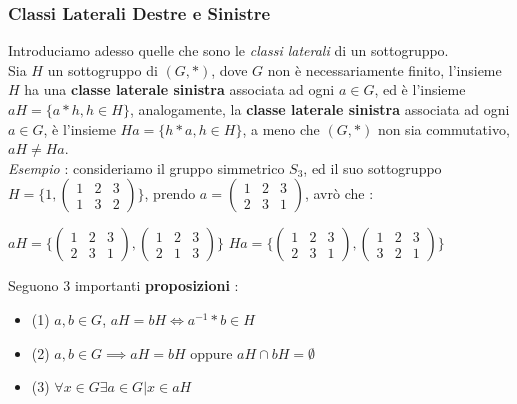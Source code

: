 \documentclass[12pt, letterpaper]{article}
\begin{document}
\subsubsection{Classi Laterali Destre e Sinistre}
 Introduciamo adesso quelle che sono le \textit{classi laterali} di un sottogruppo.\\
 Sia \(H\) un sottogruppo di \((G,*)\), dove \(G\) non è necessariamente finito, l'insieme 
 \(H\) ha una \textbf{classe laterale sinistra} associata ad ogni \(a\in G\), ed è l'insieme \(aH=\{a*h, h\in H\}\), 
 analogamente, la \textbf{classe laterale sinistra} associata ad ogni \(a\in G\),  è l'insieme \(Ha=\{h*a, h\in H\}\), 
 a meno che \((G,*)\) non sia commutativo, \(aH\ne Ha\). \\
 \textit{Esempio }: consideriamo il gruppo simmetrico \(S_3\), ed il suo sottogruppo \(H=\Bigg\{1,
 \begin{pmatrix}
    1 & 2 & 3\\
    1 & 3 & 2
    \end{pmatrix}
    \Bigg\}\), prendo \(a= \begin{pmatrix}
        1 & 2 & 3\\
        2 & 3 & 1
        \end{pmatrix}\), avrò che : \begin{center}
            \(
            aH=  \Bigg\{\begin{pmatrix}
                1 & 2 & 3\\
                2 & 3 & 1
                \end{pmatrix},
            \begin{pmatrix}
               1 & 2 & 3\\
               2 & 1 & 3
               \end{pmatrix}
               \Bigg\}  
            \) \hphantom{aaaaa} \(
            Ha=   \Bigg\{\begin{pmatrix}
                1 & 2 & 3\\
                2 & 3 & 1
                \end{pmatrix},
            \begin{pmatrix}
               1 & 2 & 3\\
               3 & 2 & 1
               \end{pmatrix}
               \Bigg\} 
            \)
        \end{center}
Seguono 3 importanti \textbf{proposizioni} : \begin{itemize}
    \item (1) \(a,b\in G\), \(aH=bH\iff a^{-1}*b\in H\)
    \item (2) \(a,b\in G\implies aH=bH \) oppure \(aH\cap bH =\emptyset\) 
    \item (3) \(\forall x \in G \exists a\in G | x\in aH\)
\end{itemize}
\end{document}
